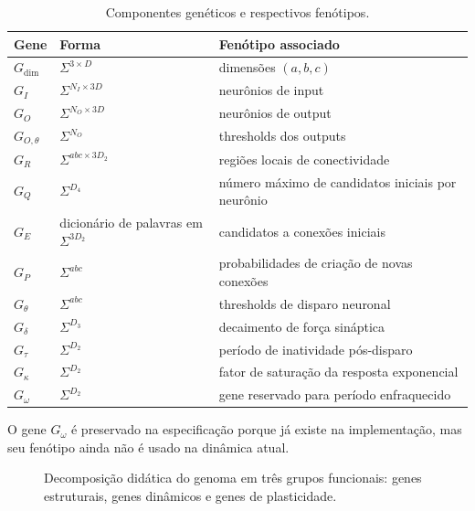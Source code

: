 \documentclass[12pt,a4paper,fleqn]{article}
\newcommand{\SigmaGen}{\Sigma}
\begin{document}
\begin{table}[H]
\centering
\caption{Componentes genéticos e respectivos fenótipos.}
\label{tab:genes}
\begin{tabular}{p{3.1cm}p{4.4cm}p{7.2cm}}
\toprule
Gene & Forma & Fenótipo associado \\
\midrule
$G_{\dim}$ & $\SigmaGen^{3\times D}$ & dimensões $(a,b,c)$ \\
$G_I$ & $\SigmaGen^{N_I\times 3D}$ & neurônios de input \\
$G_O$ & $\SigmaGen^{N_O\times 3D}$ & neurônios de output \\
$G_{O,\theta}$ & $\SigmaGen^{N_O}$ & thresholds dos outputs \\
$G_R$ & $\SigmaGen^{abc\times 3D_2}$ & regiões locais de conectividade \\
$G_Q$ & $\SigmaGen^{D_4}$ & número máximo de candidatos iniciais por neurônio \\
$G_E$ & dicionário de palavras em $\SigmaGen^{3D_2}$ & candidatos a conexões iniciais \\
$G_P$ & $\SigmaGen^{abc}$ & probabilidades de criação de novas conexões \\
$G_\theta$ & $\SigmaGen^{abc}$ & thresholds de disparo neuronal \\
$G_\delta$ & $\SigmaGen^{D_3}$ & decaimento de força sináptica \\
$G_\tau$ & $\SigmaGen^{D_2}$ & período de inatividade pós-disparo \\
$G_\kappa$ & $\SigmaGen^{D_2}$ & fator de saturação da resposta exponencial \\
$G_\omega$ & $\SigmaGen^{D_2}$ & gene reservado para período enfraquecido \\
\bottomrule
\end{tabular}
\end{table}

O gene $G_\omega$ é preservado na especificação porque já existe na implementação, mas seu fenótipo ainda não é usado na dinâmica atual.

\begin{figure}[H]
\centering
{}
\caption{Decomposição didática do genoma em três grupos funcionais: genes estruturais, genes dinâmicos e genes de plasticidade.}
\label{fig:decomposicao-genoma}
\end{figure}
\end{document}
